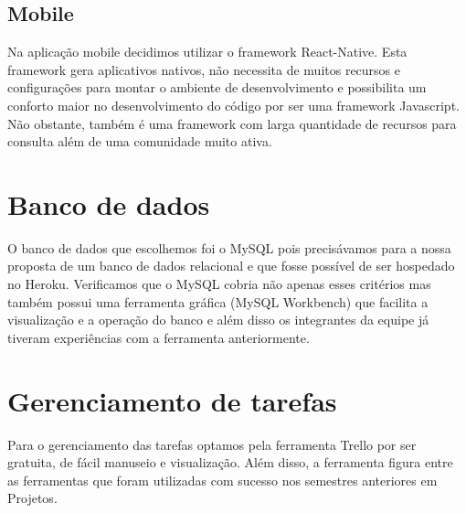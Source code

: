 \subsection{Mobile}
Na aplicação mobile decidimos utilizar o framework React-Native. Esta framework gera aplicativos nativos, não necessita de muitos recursos e configurações para montar o ambiente de desenvolvimento e possibilita um conforto maior no desenvolvimento do código por ser uma framework Javascript. Não obstante, também é uma framework com larga quantidade de recursos para consulta além de uma comunidade muito ativa.

\section{Banco de dados}
O banco de dados que escolhemos foi o MySQL pois precisávamos para a nossa proposta de um banco de dados relacional e que fosse possível de ser hospedado no Heroku. Verificamos que o MySQL cobria não apenas esses critérios mas também possui uma ferramenta gráfica (MySQL Workbench) que facilita a visualização e a operação do banco e além disso os integrantes da equipe já tiveram experiências com a ferramenta anteriormente.

\section{Gerenciamento de tarefas}
Para o gerenciamento das tarefas optamos pela ferramenta Trello por ser gratuita, de fácil manuseio e visualização.
Além disso, a ferramenta figura entre as ferramentas que foram utilizadas com sucesso nos semestres anteriores em Projetos.



